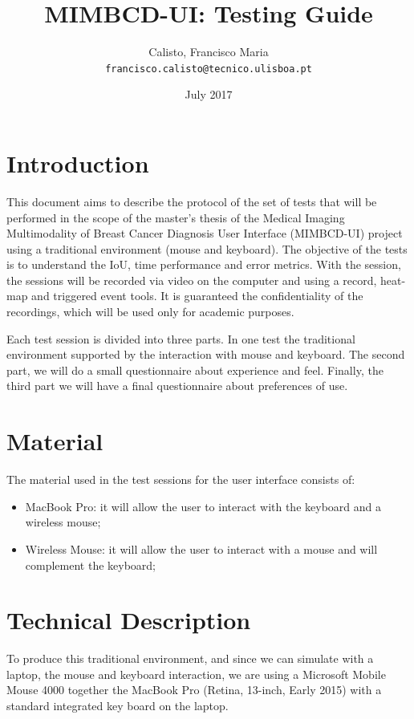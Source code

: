 \documentclass{article}
\title{MIMBCD-UI: Testing Guide}
\author{
  Calisto, Francisco Maria\\
  \texttt{francisco.calisto@tecnico.ulisboa.pt}
}
\date{July 2017}
\begin{document}
\maketitle

\section{Introduction}

This document aims to describe the protocol of the set of tests that will be performed in the scope of the master's thesis of the Medical Imaging Multimodality of Breast Cancer Diagnosis User Interface (MIMBCD-UI) project using a traditional environment (mouse and keyboard). The objective of the tests is to understand the IoU, time performance and error metrics. With the session, the sessions will be recorded via video on the computer and using a record, heat-map and triggered event tools. It is guaranteed the confidentiality of the recordings, which will be used only for academic purposes.

Each test session is divided into three parts. In one test the traditional environment supported by the interaction with mouse and keyboard. The second part, we will do a small questionnaire about experience and feel. Finally, the third part we will have a final questionnaire about preferences of use.

\section{Material}

The material used in the test sessions for the user interface consists of:

\begin{itemize}
  \item MacBook Pro: it will allow the user to interact with the keyboard and a wireless mouse;
  \item Wireless Mouse: it will allow the user to interact with a mouse and will complement the keyboard;
\end{itemize}

\section{Technical Description}

To produce this traditional environment, and since we can simulate with a laptop, the mouse and keyboard interaction, we are using a Microsoft Mobile Mouse 4000 together the MacBook Pro (Retina, 13-inch, Early 2015) with a standard integrated key board on the laptop.
\end{document}
